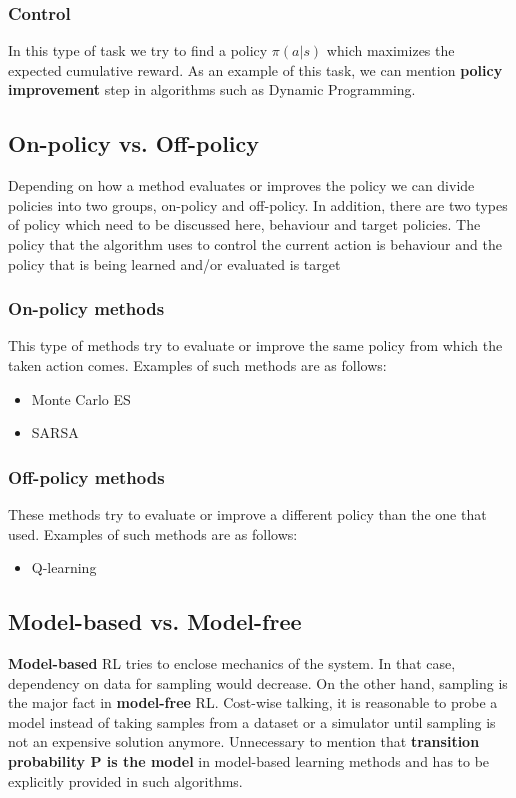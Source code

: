 \documentclass[letterpaper,12pt]{article}
\begin{document}
    \subsubsection{Control}
    In this type of task we try to find a policy $\pi(a|s)$ which maximizes the expected cumulative reward. As an example of this task, we can mention \textbf{policy improvement} step in algorithms such as Dynamic Programming.

    \subsection{On-policy vs. Off-policy}
    Depending on how a method evaluates or improves the policy we can divide policies into two groups, on-policy and off-policy. In addition, there are two types of policy which need to be discussed here, behaviour and target policies. The policy that the algorithm uses to control the current action is behaviour and the policy that is being learned and/or evaluated is target

    \subsubsection{On-policy methods}
    This type of methods try to evaluate or improve the same policy from which the taken action comes. Examples of such methods are as follows:
    \begin{itemize}
        \item Monte Carlo ES
        \item SARSA
    \end{itemize}

    \subsubsection{Off-policy methods}
    These methods try to evaluate or improve a different policy than the one that used. Examples of such methods are as follows:
    \begin{itemize}
        \item Q-learning
    \end{itemize}

    \subsection{Model-based vs. Model-free}
    \textbf{Model-based} RL tries to enclose mechanics of the system. In that case, dependency on data for sampling would decrease. On the other hand, sampling is the major fact in \textbf{model-free} RL. Cost-wise talking, it is reasonable to probe a model instead of taking samples from a dataset or a simulator until sampling is not an expensive solution anymore. Unnecessary to mention that \textbf{transition probability P is the model} in model-based learning methods and has to be explicitly provided in such algorithms.
\end{document}
